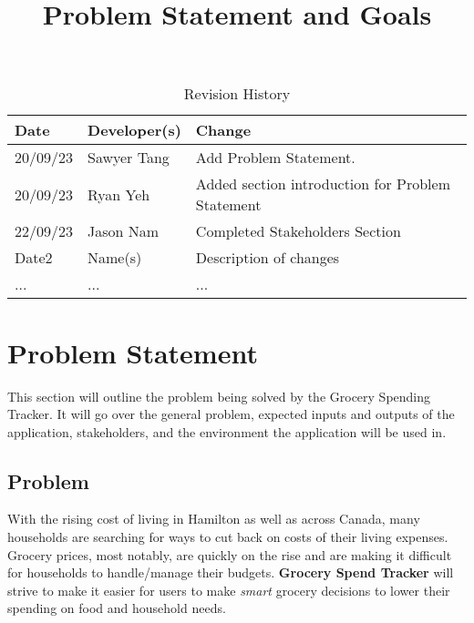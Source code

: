 \documentclass{article}
\title{Problem Statement and Goals\\\progname}
\author{\authname}
\date{}
\begin{document}
\maketitle

\begin{table}[hp]
\caption{Revision History} \label{TblRevisionHistory}
\begin{tabularx}{\textwidth}{llX}
\toprule
\textbf{Date} & \textbf{Developer(s)} & \textbf{Change}\\
\midrule
20/09/23 & Sawyer Tang & Add Problem Statement.\\
20/09/23 & Ryan Yeh & Added section introduction for Problem Statement\\
22/09/23 & Jason Nam & Completed Stakeholders Section\\
Date2 & Name(s) & Description of changes\\
... & ... & ...\\
\bottomrule
\end{tabularx}
\end{table}

\section{Problem Statement}


This section will outline the problem being solved by the Grocery Spending Tracker. It will go
over the general problem, expected inputs and outputs of the application, stakeholders, and the environment
the application will be used in.

\subsection{Problem}

With the rising cost of living in Hamilton as well as across Canada, many households are searching for ways to cut back on costs of their living expenses. Grocery prices, most notably, are quickly on the rise and are making it difficult for households to handle/manage their budgets. \textbf{Grocery Spend Tracker} will strive to make it easier for users to make \textit{smart} grocery decisions to lower their spending on food and household needs.
\end{document}
